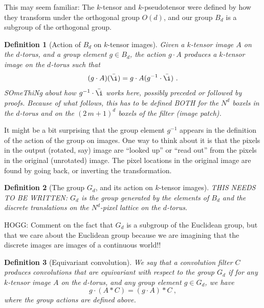\documentclass{article}
\theoremstyle{plain}
\newtheorem{definition}{Definition}
\begin{document}
This may seem familiar: The $k$-tensor and $k$-pseudotensor were defined by how they transform under the orthogonal group $O(d)$, and our group $B_d$ is a subgroup of the orthogonal group.

\begin{definition}[Action of $B_d$ on $k$-tensor images]
Given a $k$-tensor image $A$ on the $d$-torus, and a group element $g\in B_d$, the action $g\cdot A$ produces a $k$-tensor image on the $d$-torus such that
\begin{equation}
    (g\cdot A)(\bar\i) = g\cdot A({g^{-1}\cdot \bar\i}) ~.
\end{equation}
SOmeThiNg about how $g^{-1}\cdot\bar\i$ works here, possibly preceded or followed by proofs. Because of what follows, this has to be defined BOTH for the $N^d$ boxels in the $d$-torus and on the $(2\,m+1)^d$ boxels of the filter (image patch).
\end{definition}

It might be a bit surprising that the group element $g^{-1}$ appears in the definition of the action of the group on images.
One way to think about it is that the pixels in the output (rotated, say) image are ``looked up'' or ``read out'' from the pixels in the original (unrotated) image.
The pixel locations in the original image are found by going back, or inverting the transformation.

\begin{definition}[The group $G_d$, and its action on $k$-tensor images]
THIS NEEDS TO BE WRITTEN: $G_d$ is the group generated by the elements of $B_d$ and the discrete translations on the $N^d$-pixel lattice on the $d$-torus.
\end{definition}

HOGG: Comment on the fact that $G_d$ is a subgroup of the Euclidean group, but that we care about the Euclidean group because we are imagining that the discrete images are images of a continuous world!!

\begin{definition}[Equivariant convolution]
We say that a convolution filter $C$ produces convolutions that are equivariant with respect to the group $G_d$ if for any $k$-tensor image $A$ on the $d$-torus, and any group element $g\in G_d$, we have
\begin{equation}
    g\cdot (A\ast C) = (g\cdot A)\ast C ~,
\end{equation}
where the group actions are defined above.
\end{definition}
\end{document}
